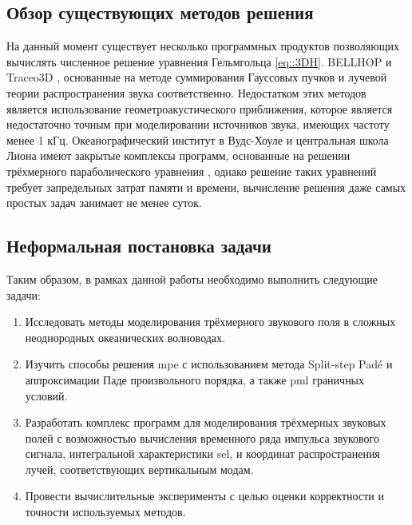 \documentclass[../document.tex]{subfiles}
\begin{document}
		\subsection{Обзор существующих методов решения}
			\par На данный момент существует несколько программных продуктов позволяющих вычислять численное решение уравнения Гельмгольца \eqref{eq::3DH}. BELLHOP \cite{bellhop} и Traceo3D \cite{traceo}, основанные на методе суммирования Гауссовых пучков и лучевой теории распространения звука соответственно. Недостатком этих методов является использование геометроакустического приближения, которое является недостаточно точным при моделировании источников звука, имеющих частоту менее 1 кГц. Океанографический институт в Вудс-Хоуле \cite{whoi} и центральная школа Лиона \cite{lyon} имеют закрытые комплексы программ, основанные на решении трёхмерного параболического уравнения \cite{isakson14,lin12,shtrum16}, однако решение таких уравнений требует запредельных затрат памяти и времени, вычисление решения даже самых простых задач занимает не менее суток.
		\subsection{Неформальная постановка задачи}
			\par Таким образом, в рамках данной работы необходимо выполнить следующие задачи:
			\begin{enumerate}
				\item Исследовать методы моделирования трёхмерного звукового поля в сложных неоднородных океанических волноводах.
				\item Изучить способы решения \acrshort{mpe} с использованием метода Split-step Pad\'e и аппроксимации Паде произвольного порядка, а также \acrshort{pml} граничных условий.
				\item Разработать комплекс программ для моделирования трёхмерных звуковых полей с возможностью вычисления временного ряда импульса звукового сигнала, интегральной характеристики \acrshort{sel}, и координат распространения лучей, соответствующих вертикальным модам.
                \item Провести вычислительные эксперименты с целью оценки корректности и точности используемых методов.
			\end{enumerate}
\end{document}
